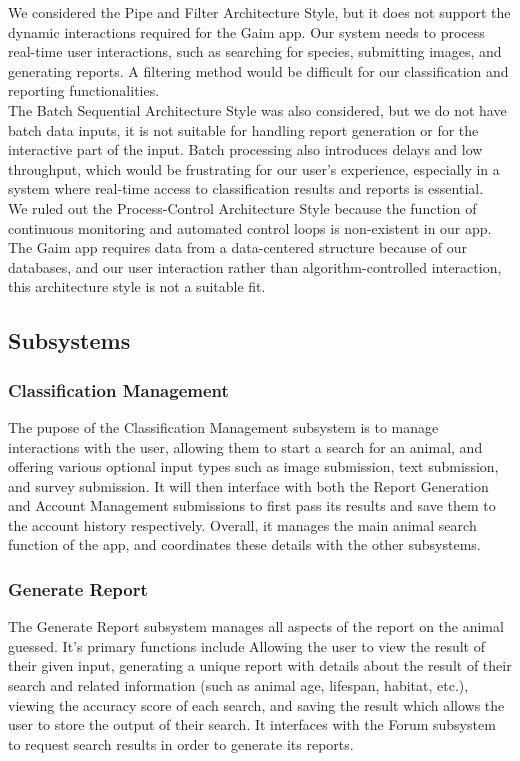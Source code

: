 \documentclass[]{article}
\begin{document}
We considered the Pipe and Filter Architecture Style, but it does not support the dynamic interactions required for the Gaim app. Our system needs to process real-time user interactions, such as searching for species, submitting images, and generating reports. A filtering method would be difficult for our classification and reporting functionalities.
\\

The Batch Sequential Architecture Style was also considered, but we do not have batch data inputs, it is not suitable for handling report generation or for the interactive part of the input. Batch processing also introduces delays and low throughput, which would be frustrating for our user's experience, especially in a system where real-time access to classification results and reports is essential.
\\

We ruled out the Process-Control Architecture Style because the function of continuous monitoring and automated control loops is non-existent in our app. The Gaim app requires data from a data-centered structure because of our databases, and our user interaction rather than algorithm-controlled interaction, this architecture style is not a suitable fit.
\\
\subsection{Subsystems}
\label{sub:subsystems}
\subsubsection{Classification Management}
The pupose of the Classification Management subsystem is to manage interactions with the user, allowing them to start a search for an animal, and offering various optional input types such as image submission, text submission, and survey submission. It will then interface with both the Report Generation and Account Management submissions to first pass its results and save them to the account history respectively. Overall, it manages the main animal search function of the app, and coordinates these details with the other subsystems.
\subsubsection{Generate Report}
The Generate Report subsystem manages all aspects of the report on the animal guessed. It's primary functions include Allowing the user to view the result of their given input, generating a unique report with details about the result of their search and related information (such as animal age, lifespan, habitat, etc.), viewing the accuracy score of each search, and saving the result which allows the user to store the output of their search.
It interfaces with the Forum subsystem to request search results in order to generate its reports.
\end{document}
